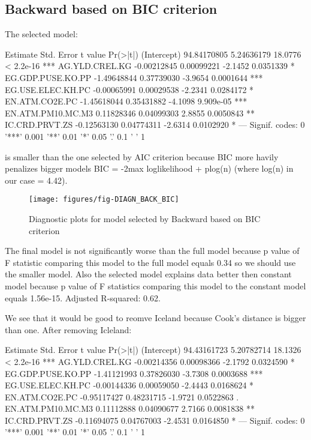\documentclass[a4paper]{article}
\begin{document}
\subsection{Backward based on BIC criterion}
The selected model:
\begin{Schunk}
\begin{Soutput}
                     Estimate  Std. Error t value  Pr(>|t|)    
(Intercept)       94.84170805  5.24636179 18.0776 < 2.2e-16 ***
AG.YLD.CREL.KG    -0.00212845  0.00099221 -2.1452 0.0351339 *  
EG.GDP.PUSE.KO.PP -1.49648844  0.37739030 -3.9654 0.0001644 ***
EG.USE.ELEC.KH.PC -0.00065991  0.00029538 -2.2341 0.0284172 *  
EN.ATM.CO2E.PC    -1.45618044  0.35431882 -4.1098 9.909e-05 ***
EN.ATM.PM10.MC.M3  0.11828346  0.04099303  2.8855 0.0050843 ** 
IC.CRD.PRVT.ZS    -0.12563130  0.04774311 -2.6314 0.0102920 *  
---
Signif. codes:  0 '***' 0.001 '**' 0.01 '*' 0.05 '.' 0.1 ' ' 1
\end{Soutput}
\end{Schunk}
is smaller than the one selected by AIC criterion because BIC more havily
penalizes bigger models BIC = -2max loglikelihood + plog(n) (where log(n) in our
case = 4.42).

\begin{figure}[H]
\begin{center}
\texttt{[image: figures/fig-DIAGN\_BACK\_BIC]}
\caption{Diagnostic plots for model selected by Backward based on BIC criterion}
\end{center}
\end{figure}

The final model is not significantly worse than
the full model because p value of F statistic comparing this model to the full
model equals
0.34 so we should use the smaller model. Also the selected model explains data better then constant model because p value of F statistics comparing this model to the
constant model equals 
1.56e-15.
Adjusted R-squared:
0.62.

We see that it would be good to reomve Iceland because Cook's distance is bigger
than one. After removing Icleland:

\begin{Schunk}
\begin{Soutput}
                     Estimate  Std. Error t value  Pr(>|t|)    
(Intercept)       94.43161723  5.20782714 18.1326 < 2.2e-16 ***
AG.YLD.CREL.KG    -0.00214356  0.00098366 -2.1792 0.0324590 *  
EG.GDP.PUSE.KO.PP -1.41121993  0.37826030 -3.7308 0.0003688 ***
EG.USE.ELEC.KH.PC -0.00144336  0.00059050 -2.4443 0.0168624 *  
EN.ATM.CO2E.PC    -0.95117427  0.48231715 -1.9721 0.0522863 .  
EN.ATM.PM10.MC.M3  0.11112888  0.04090677  2.7166 0.0081838 ** 
IC.CRD.PRVT.ZS    -0.11694075  0.04767003 -2.4531 0.0164850 *  
---
Signif. codes:  0 '***' 0.001 '**' 0.01 '*' 0.05 '.' 0.1 ' ' 1
\end{Soutput}
\end{Schunk}
\end{document}
